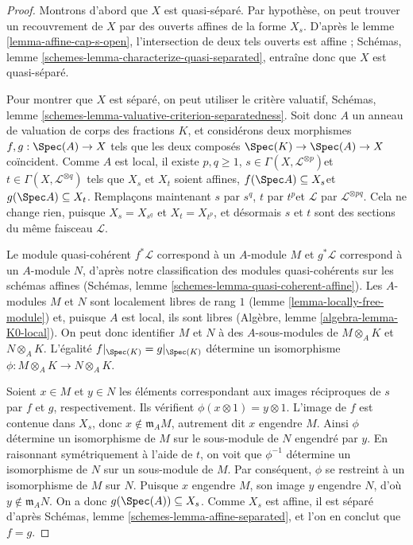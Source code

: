 \begin{proof}
Montrons d'abord que $X$ est quasi-séparé. Par hypothèse, on peut
trouver un recouvrement de $X$ par des ouverts affines de la forme
$X_s$. D'après le lemme \ref{lemma-affine-cap-s-open},
l'intersection de deux tels ouverts est affine ; Schémas, lemme
\ref{schemes-lemma-characterize-quasi-separated}, entraîne
donc que $X$ est quasi-séparé.

\medskip\noindent
Pour montrer que $X$ est séparé, on peut utiliser le critère
valuatif, Schémas, lemme
\ref{schemes-lemma-valuative-criterion-separatedness}.
Soit donc $A$ un anneau de valuation de corps des fractions $K$,
et considérons deux morphismes $f, g : \Spec(A) \to X$ tels que
les deux composés $\Spec(K) \to \Spec(A) \to X$ coïncident.
Comme $A$ est local, il existe $p, q \ge 1$, $s \in \Gamma(X,
\mathcal{L}^{\otimes p})$et $ t \in \Gamma(X,
\mathcal{L}^{\otimes q})$ tels que $X_s$ et $X_t$ soient
affines, $f(\Spec A) \subseteq X_s$et $g(\Spec A)
\subseteq X_t$. Remplaçons maintenant $s$ par $s^q$, $t$ par $t^p$et
 $\mathcal{L}$ par $\mathcal{L}^{\otimes pq}$. Cela ne
change rien, puisque $X_s = X_{s^q}$ et $X_t = X_{t^p}$, et désormais $s$
et $t$ sont des sections du même faisceau $\mathcal{L}$.

\medskip\noindent
Le module quasi-cohérent $f^*\mathcal{L}$ correspond à un $A$-module $M$ et
$g^*\mathcal{L}$ correspond à un $A$-module $N$,
d'après notre classification des modules quasi-cohérents sur les schémas
affines (Schémas, lemme \ref{schemes-lemma-quasi-coherent-affine}).
Les $A$-modules $M$ et $N$ sont localement libres de rang
$1$ (lemme \ref{lemma-locally-free-module}) et, puisque $A$ est
local, ils sont libres (Algèbre, lemme
\ref{algebra-lemma-K0-local}). On peut donc identifier
$M$ et $N$ à des $A$-sous-modules de $M \otimes_A K$ et $N
\otimes_A K$. L'égalité $f|_{\Spec(K)} = g|_{\Spec(K)}$
détermine un isomorphisme $\phi \colon M \otimes_A K \to N
\otimes_A K$.

\medskip\noindent
Soient $x \in M$ et $y \in N$ les éléments correspondant aux
images réciproques de $s$ par $f$ et $g$, respectivement. Ils
vérifient $\phi(x \otimes 1) = y \otimes 1$. L'image de $f$
est contenue dans $X_s$, donc $x \not\in \mathfrak{m}_A M$,
autrement dit $x$ engendre $M$. Ainsi $\phi$ détermine un
isomorphisme de $M$ sur le sous-module de $N$ engendré par
$y$. En raisonnant symétriquement à l'aide de $t$, on voit que $\phi^{-1}$
détermine un isomorphisme de $N$ sur un sous-module de $M$.
Par conséquent, $\phi$ se restreint à un isomorphisme de $M$ sur
$N$. Puisque $x$ engendre $M$, son image $y$ engendre
$N$, d'où $y \not\in \mathfrak{m}_A N$. On a donc
$g(\Spec(A)) \subseteq X_s$. Comme $X_s$ est affine, il est
séparé d'après Schémas, lemme \ref{schemes-lemma-affine-separated},
et l'on en conclut que $f = g$.
\end{proof}

